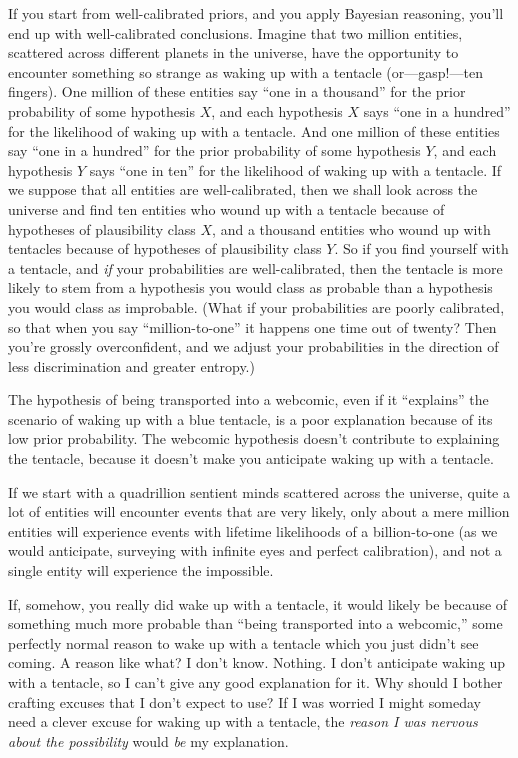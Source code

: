 {
 If you start from well-calibrated priors, and you apply Bayesian
reasoning, you'll end up with well-calibrated
conclusions. Imagine that two million entities, scattered across
different planets in the universe, have the opportunity to encounter
something so strange as waking up with a tentacle (or---gasp!---ten
fingers). One million of these entities say ``one in a
thousand'' for the prior probability of some
hypothesis $X$, and each hypothesis $X$ says ``one in a
hundred'' for the likelihood of waking up with a
tentacle. And one million of these entities say ``one
in a hundred'' for the prior probability of some
hypothesis $Y$, and each hypothesis $Y$ says ``one in
ten'' for the likelihood of waking up with a
tentacle. If we suppose that all entities are well-calibrated, then we
shall look across the universe and find ten entities who wound up with
a tentacle because of hypotheses of plausibility class $X$, and a
thousand entities who wound up with tentacles because of hypotheses of
plausibility class $Y$. So if you find yourself with a tentacle, and
\textit{if} your probabilities are well-calibrated, then the tentacle
is more likely to stem from a hypothesis you would class as probable
than a hypothesis you would class as improbable. (What if your
probabilities are poorly calibrated, so that when you say
``million-to-one'' it happens one
time out of twenty? Then you're grossly overconfident,
and we adjust your probabilities in the direction of less
discrimination and greater entropy.)}

{
 The hypothesis of being transported into a webcomic, even if it
``explains'' the scenario of waking
up with a blue tentacle, is a poor explanation because of its low prior
probability. The webcomic hypothesis doesn't contribute
to explaining the tentacle, because it doesn't make you
anticipate waking up with a tentacle.}

{
 If we start with a quadrillion sentient minds scattered across the
universe, quite a lot of entities will encounter events that are very
likely, only about a mere million entities will experience events with
lifetime likelihoods of a billion-to-one (as we would anticipate,
surveying with infinite eyes and perfect calibration), and not a single
entity will experience the impossible.}

{
 If, somehow, you really did wake up with a tentacle, it would
likely be because of something much more probable than
``being transported into a
webcomic,'' some perfectly normal reason to wake up
with a tentacle which you just didn't see coming. A
reason like what? I don't know. Nothing. I
don't anticipate waking up with a tentacle, so I
can't give any good explanation for it. Why should I
bother crafting excuses that I don't expect to use? If
I was worried I might someday need a clever excuse for waking up with a
tentacle, the \textit{reason I was nervous about the possibility} would
\textit{be} my explanation.}

